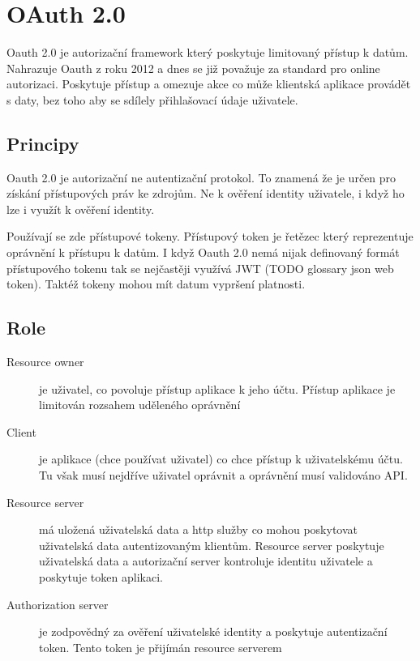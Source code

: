 \section{OAuth 2.0}
Oauth 2.0 je autorizační framework který poskytuje limitovaný přístup k datům. Nahrazuje Oauth z roku 2012 a dnes se již považuje za standard pro online autorizaci. Poskytuje přístup a omezuje akce co může klientská aplikace provádět s daty, bez toho aby se sdílely přihlašovací údaje uživatele.


\subsection{Principy}
Oauth 2.0 je autorizační ne autentizační protokol. To znamená že je určen pro získání přístupových práv ke zdrojům. Ne k ověření identity uživatele, i když ho lze i využít k ověření identity.

Používají se zde přístupové tokeny. Přístupový token je řetězec který reprezentuje oprávnění k přístupu k datům. I když Oauth 2.0 nemá nijak definovaný formát přístupového tokenu tak se nejčastěji využívá JWT (TODO glossary json web token). Taktéž tokeny mohou mít datum vypršení platnosti.

\subsection{Role}\label{sec:Oauth_roles}
\begin{description}
    \item[Resource owner] je uživatel, co povoluje přístup aplikace k jeho účtu. Přístup aplikace je limitován rozsahem uděleného oprávnění
    \item[Client] je aplikace (chce používat uživatel) co chce přístup k uživatelskému účtu. Tu však musí nejdříve uživatel oprávnit a oprávnění musí validováno API.
    \item[Resource server] má uložená uživatelská data a http služby co mohou poskytovat uživatelská data autentizovaným klientům. Resource server poskytuje uživatelská data a autorizační server kontroluje identitu uživatele a poskytuje token aplikaci.
    \item[Authorization server] je zodpovědný za ověření uživatelské identity a poskytuje autentizační token. Tento token je přijímán resource serverem
\end{description}

